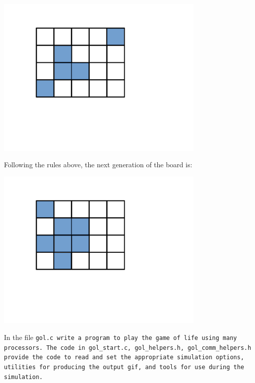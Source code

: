 \documentclass{article}
\begin{document}
\begin{enumerate}
  \begin{center}
    \includegraphics[trim={4cm 7cm 10cm 3cm},clip,width=4in]{figs/gol_0.pdf}
  \end{center}
  Following the rules above, the next generation of the board is:
  \begin{center}
    \includegraphics[trim={4cm 7cm 10cm 3cm},clip,width=4in]{figs/gol_1.pdf}
  \end{center}

In the file \tt{gol.c} write a program to play the game of life
using many processors.  The code in \tt{gol\_start.c},
\tt{gol\_helpers.h}, \tt{gol\_comm\_helpers.h} provide the code to
read and set the appropriate simulation options, utilities for
producing the output gif, and tools for use during the simulation. 


\end{enumerate}
\end{document}
